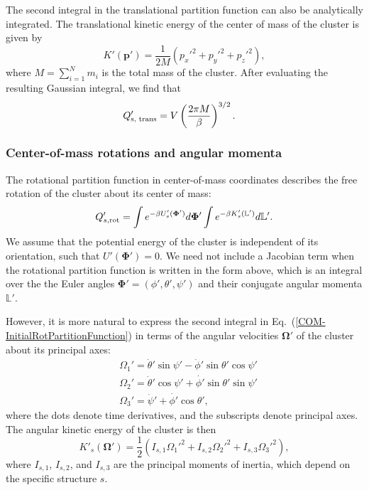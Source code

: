 \documentclass[pre, aps, twocolumn, reprint, amsmath,amssymb, showpacs,
superscriptaddress] {revtex4-1}
\begin{document}
The second integral in the translational partition function can also be
analytically integrated. The translational kinetic energy of the center
of mass of the cluster is given by
\begin{equation*}
	K'(\mathbf{p}') = \frac{1}{2M} (p_x'^2 + p_y'^2 + p_z'^2),
\end{equation*}
where $M=\sum_{i=1}^{N}{m_i}$ is the total mass of the cluster. After
evaluating the resulting Gaussian integral, we find that
\begin{equation*}
	\begin{split}
		Q_{\textnormal{s, trans}}' & = V \left( {\frac{2 \pi M}{\beta}} \right)^{3/2}.
    \end{split}
\end{equation*}


\subsubsection{Center-of-mass rotations and angular momenta}
\label{COM_Rotations}

The rotational partition function in center-of-mass coordinates
describes the free rotation of the cluster about its center of mass:
\begin{equation} \label{COM-InitialRotPartitionFunction}
Q_{s, \textnormal{rot}}' = \int e^{-\beta U'_s(\bm{\Phi}')} d\bm{\Phi}' 
\int e^{-\beta K'_s(\mathbb{L}')} d\mathbb{L}'.
\end{equation}  We assume that the potential energy of the cluster is
independent of its orientation, such that $U'(\bm{\Phi}') = 0$.  We need
not include a Jacobian term when the rotational partition function is
written in the form above, which is an integral over the the Euler
angles $\bm{\Phi}' = (\phi', \theta', \psi')$ and their conjugate
angular momenta $\mathbb{L}'$.

However, it is more natural to express the second integral in
Eq.~(\ref{COM-InitialRotPartitionFunction}) in terms of the angular
velocities $\bm{\Omega}'$ of the cluster about its principal axes:
\begin{equation*}
\begin{split}
&\Omega_1' = \dot{\theta}' \sin{\psi'} - \dot{\phi}'\sin{\theta'}\cos{\psi'}\\
&\Omega_2' = \dot{\theta}' \cos{\psi'} + \dot{\phi'}\sin{\theta'}\sin{\psi'}\\
&\Omega_3' = \dot{\psi}'+\dot{\phi'}\cos{\theta'},
\end{split}
\end{equation*}
where the dots denote time derivatives, and the subscripts denote
principal axes. The angular kinetic energy of the cluster is then
\begin{equation}\label{COM-Kinetic}
	K'_s(\bm{\Omega}') = \frac{1}{2} \left( I_{s, 1}\Omega_1'^2 + I_{s, 2}\Omega_2'^2 + I_{s, 3}\Omega_3'^2 \right),
\end{equation}
where $I_{s, 1}$, $I_{s, 2}$, and $I_{s, 3}$ are the principal moments
of inertia, which depend on the specific structure $s$.
\end{document}
